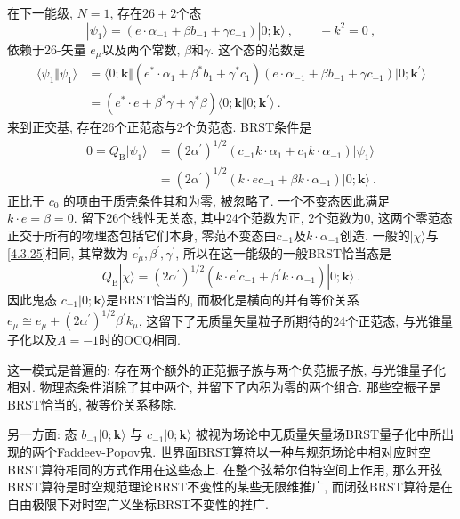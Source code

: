 在下一能级, $N=1$, 存在$26+2$个态
\begin{equation}
|\psi_{1}\rangle= (e \cdot \alpha_{-1}+\beta b_{-1}+\gamma c_{-1})|0 ; \mathbf{k}\rangle\:, \qquad -k^{2}=0 \:, \label{4.3.25}
\end{equation}
依赖于26-矢量 $e_{\mu}$以及两个常数, $\beta$和$\gamma$. 这个态的范数是
\begin{align}
\langle\psi_{1} \Vert \psi_{1}\rangle &= \langle 0 ; \mathbf{k} \Vert (e^{*} \cdot \alpha_{1}+\beta^{*} b_{1}+\gamma^{*} c_{1})
(e \cdot \alpha_{-1}+\beta b_{-1}+\gamma c_{-1}) \vert 0 ; \mathbf{k}^{\prime}\rangle  \nonumber \\
&=(e^{*} \cdot e+\beta^{*} \gamma+\gamma^{*} \beta) \langle 0 ; \mathbf{k} \Vert 0 ; \mathbf{k}^{\prime}\rangle \:. \label{4.3.26}
\end{align}
来到正交基, 存在26个正范态与2个负范态. BRST条件是
\begin{align}
0=Q_{\mathrm{B}}|\psi_{1}\rangle &= (2 \alpha^{\prime})^{1 / 2} (c_{-1} k \cdot \alpha_{1}+c_{1} k \cdot \alpha_{-1})|\psi_{1}\rangle \nonumber  \\
&=(2 \alpha^{\prime})^{1 / 2}(k \cdot e c_{-1}+\beta k \cdot \alpha_{-1})|0 ; \mathbf{k}\rangle  \:. \label{4.3.27}
\end{align}
正比于 $c_{0}$ 的项由于质壳条件其和为零, 被忽略了.  一个不变态因此满足$k \cdot e=\beta=0 $. 留下26个线性无关态, 其中24个范数为正, 2个范数为0, 这两个零范态正交于所有的物理态包括它们本身, 零范不变态由$c_{-1}$及$k \cdot \alpha_{-1}$创造. 一般的$|\chi\rangle$与\eqref{4.3.25}相同, 其常数为 $e_{\mu}^{\prime}, \beta^{\prime}, \gamma^{\prime}$, 所以在这一能级的一般BRST恰当态是
\begin{equation}
Q_{\mathrm{B}}|\chi\rangle= (2 \alpha^{\prime})^{1 / 2} (k \cdot e^{\prime} c_{-1}+\beta^{\prime} k \cdot \alpha_{-1})|0 ; \mathbf{k}\rangle \:. \label{4.3.28}
\end{equation}
因此鬼态 $c_{-1}|0 ; \mathbf{k}\rangle$是BRST恰当的, 而极化是横向的并有等价关系$e_{\mu} \cong e_{\mu}+(2 \alpha^{\prime})^{1 / 2} \beta^{\prime} k_{\mu} $, 这留下了无质量矢量粒子所期待的24个正范态, 与光锥量子化以及$A=-1$时的OCQ相同.

这一模式是普遍的: 存在两个额外的正范振子族与两个负范振子族, 与光锥量子化相对. 物理态条件消除了其中两个, 并留下了内积为零的两个组合. 那些空振子是BRST恰当的, 被等价关系移除.

另一方面: 态 $b_{-1}|0 ; \mathbf{k}\rangle$ 与 $c_{-1}|0 ; \mathbf{k}\rangle$ 被视为场论中无质量矢量场BRST量子化中所出现的两个Faddeev-Popov鬼. 
世界面BRST算符以一种与规范场论中相对应时空BRST算符相同的方式作用在这些态上.  在整个弦希尔伯特空间上作用, 那么开弦BRST算符是时空规范理论BRST不变性的某些无限维推广, 而闭弦BRST算符是在自由极限下对时空广义坐标BRST不变性的推广.

